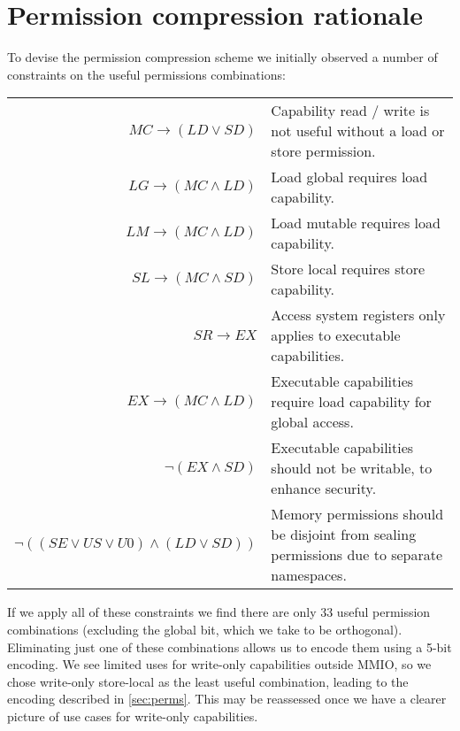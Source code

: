 \chapter{Permission compression rationale}
\label{chap:permissions}

To devise the permission compression scheme we initially observed a number of constraints on the useful permissions combinations:

\vspace{1em}
\begin{tabularx}{\textwidth}{rX}
$MC \rightarrow (LD \lor SD)$   & Capability read / write is not useful without a load or store permission. \\
$LG \rightarrow (MC \land  LD)$ & Load global requires load capability. \\
$LM \rightarrow (MC \land  LD)$ & Load mutable requires load capability. \\
$SL \rightarrow (MC \land  SD)$ & Store local requires store capability. \\
$SR \rightarrow EX$             & Access system registers only applies to executable capabilities. \\
$EX \rightarrow (MC \land LD)$  & Executable capabilities require load capability for global access. \\
$\neg(EX \land SD)$             & Executable capabilities should not be writable, to enhance security. \\
$\neg((SE \lor US \lor U0) \land (LD \lor SD))$ & Memory permissions should be disjoint from sealing permissions due to separate namespaces. \\
\end{tabularx}
\vspace{1em}

If we apply all of these constraints we find there are only 33 useful permission combinations
(excluding the global bit, which we take to be orthogonal).
Eliminating just one of these combinations allows us to encode them using a 5-bit encoding.
We see limited uses for write-only capabilities outside MMIO, so we chose write-only store-local as the least useful combination, leading to the encoding described in \cref{sec:perms}.
This may be reassessed once we have a clearer picture of use cases for write-only capabilities.
